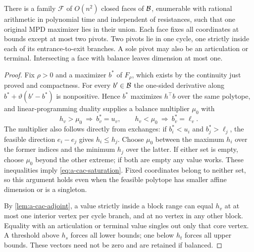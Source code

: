 \begin{lemma}
\label{lem:a-cac-faces}
There is a family $\mathcal F$ of $O(n^2)$ closed faces of $\mathcal{B}$,
enumerable with rational arithmetic in polynomial time and independent
of resistances, such that one original MPD maximizer lies in their
union. Each face fixes all coordinates at bounds except at most two
pivots. Two pivots lie in one cycle, one strictly inside each of its
entrance-to-exit branches. A sole pivot may also be an articulation or
terminal. Intersecting a face with balance leaves dimension at most one.
\end{lemma}
\begin{proof}
Fix $\rho>0$ and a maximizer $b^*$ of $F_\rho$, which exists by the
continuity just proved and compactness. For every $b'\in\mathcal{B}$ the
one-sided derivative along $b^*+\vartheta(b'-b^*)$ is nonpositive. Hence
$b^*$ maximizes $h^\top b$ over the same polytope, and linear-programming
duality supplies a balance multiplier $\mu_0$ with
\begin{equation}
 h_v>\mu_0\ \Longrightarrow\ b_v^*=u_v,\qquad
 h_v<\mu_0\ \Longrightarrow\ b_v^*=\ell_v.
 \label{eq:a-cac-saturation}
\end{equation}
The multiplier also follows directly from exchanges:
if $b_i^*<u_i$ and $b_j^*>\ell_j$, the feasible direction $e_i-e_j$
gives $h_i\le h_j$. Choose $\mu_0$ between the maximum $h_i$ over
the former indices and the minimum $h_j$ over the latter. If either
set is empty, choose $\mu_0$ beyond the other extreme; if both are
empty any value works. These inequalities imply
\cref{eq:a-cac-saturation}. Fixed coordinates belong to neither set,
so this argument holds even when the feasible polytope has smaller
affine dimension or is a singleton.

By \cref{lem:a-cac-adjoint}, a value strictly inside a block range
can equal $h_v$ at at most one interior vertex per cycle branch, and
at no vertex in any other block. Equality with an articulation or
terminal value singles out only that core vertex. A threshold above
$h_s$ forces all lower bounds; one below $h_t$ forces all upper bounds.
These vectors need not be zero and are retained if balanced.


\end{proof}
